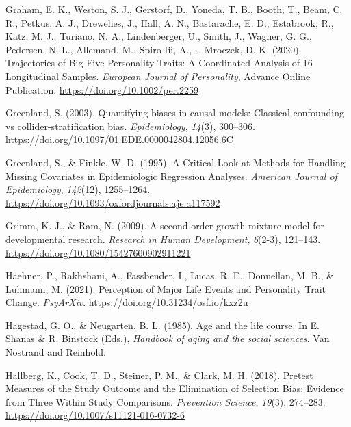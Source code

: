 \documentclass[
  english,
  man,floatsintext]{apa7}
\begin{document}
\leavevmode\hypertarget{ref-grahamTrajectoriesBigFive2020}{}%
Graham, E. K., Weston, S. J., Gerstorf, D., Yoneda, T. B., Booth, T., Beam, C. R., Petkus, A. J., Drewelies, J., Hall, A. N., Bastarache, E. D., Estabrook, R., Katz, M. J., Turiano, N. A., Lindenberger, U., Smith, J., Wagner, G. G., Pedersen, N. L., Allemand, M., Spiro Iii, A., \ldots{} Mroczek, D. K. (2020). Trajectories of Big Five Personality Traits: A Coordinated Analysis of 16 Longitudinal Samples. \emph{European Journal of Personality}, Advance Online Publication. \url{https://doi.org/10.1002/per.2259}

\leavevmode\hypertarget{ref-greenlandQuantifyingBiasesCausal2003}{}%
Greenland, S. (2003). Quantifying biases in causal models: Classical confounding vs collider-stratification bias. \emph{Epidemiology}, \emph{14}(3), 300--306. \url{https://doi.org/10.1097/01.EDE.0000042804.12056.6C}

\leavevmode\hypertarget{ref-greenlandCriticalLookMethods1995}{}%
Greenland, S., \& Finkle, W. D. (1995). A Critical Look at Methods for Handling Missing Covariates in Epidemiologic Regression Analyses. \emph{American Journal of Epidemiology}, \emph{142}(12), 1255--1264. \url{https://doi.org/10.1093/oxfordjournals.aje.a117592}

\leavevmode\hypertarget{ref-grimmSecondorderGrowthMixture2009}{}%
Grimm, K. J., \& Ram, N. (2009). A second-order growth mixture model for developmental research. \emph{Research in Human Development}, \emph{6}(2-3), 121--143. \url{https://doi.org/10.1080/15427600902911221}

\leavevmode\hypertarget{ref-haehnerPerceptionMajorLife2021}{}%
Haehner, P., Rakhshani, A., Fassbender, I., Lucas, R. E., Donnellan, M. B., \& Luhmann, M. (2021). Perception of Major Life Events and Personality Trait Change. \emph{PsyArXiv}. \url{https://doi.org/10.31234/osf.io/kxz2u}

\leavevmode\hypertarget{ref-hagestadAgeLifeCourse1985}{}%
Hagestad, G. O., \& Neugarten, B. L. (1985). Age and the life course. In E. Shanas \& R. Binstock (Eds.), \emph{Handbook of aging and the social sciences}. Van Nostrand and Reinhold.

\leavevmode\hypertarget{ref-hallbergPretestMeasuresStudy2018}{}%
Hallberg, K., Cook, T. D., Steiner, P. M., \& Clark, M. H. (2018). Pretest Measures of the Study Outcome and the Elimination of Selection Bias: Evidence from Three Within Study Comparisons. \emph{Prevention Science}, \emph{19}(3), 274--283. \url{https://doi.org/10.1007/s11121-016-0732-6}
\end{document}
